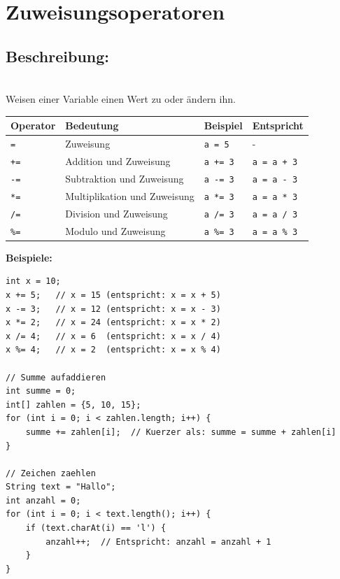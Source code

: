\newpage


\section*{Zuweisungsoperatoren}

\subsection*{Beschreibung:}\\
Weisen einer Variable einen Wert zu oder ändern ihn.

\begin{center}
\begin{tabular}{|l|l|l|l|}
\hline
\textbf{Operator} & \textbf{Bedeutung} & \textbf{Beispiel} & \textbf{Entspricht} \\
\hline
\texttt{=} & Zuweisung & \texttt{a = 5} & - \\
\hline
\texttt{+=} & Addition und Zuweisung & \texttt{a += 3} & \texttt{a = a + 3} \\
\hline
\texttt{-=} & Subtraktion und Zuweisung & \texttt{a -= 3} & \texttt{a = a - 3} \\
\hline
\texttt{*=} & Multiplikation und Zuweisung & \texttt{a *= 3} & \texttt{a = a * 3} \\
\hline
\texttt{/=} & Division und Zuweisung & \texttt{a /= 3} & \texttt{a = a / 3} \\
\hline
\texttt{\%=} & Modulo und Zuweisung & \texttt{a \%= 3} & \texttt{a = a \% 3} \\
\hline
\end{tabular}
\end{center}

\textbf{Beispiele:}
\begin{lstlisting}
int x = 10;
x += 5;   // x = 15 (entspricht: x = x + 5)
x -= 3;   // x = 12 (entspricht: x = x - 3)
x *= 2;   // x = 24 (entspricht: x = x * 2)
x /= 4;   // x = 6  (entspricht: x = x / 4)
x %= 4;   // x = 2  (entspricht: x = x % 4)

// Summe aufaddieren
int summe = 0;
int[] zahlen = {5, 10, 15};
for (int i = 0; i < zahlen.length; i++) {
    summe += zahlen[i];  // Kuerzer als: summe = summe + zahlen[i]
}

// Zeichen zaehlen
String text = "Hallo";
int anzahl = 0;
for (int i = 0; i < text.length(); i++) {
    if (text.charAt(i) == 'l') {
        anzahl++;  // Entspricht: anzahl = anzahl + 1
    }
}
\end{lstlisting}

